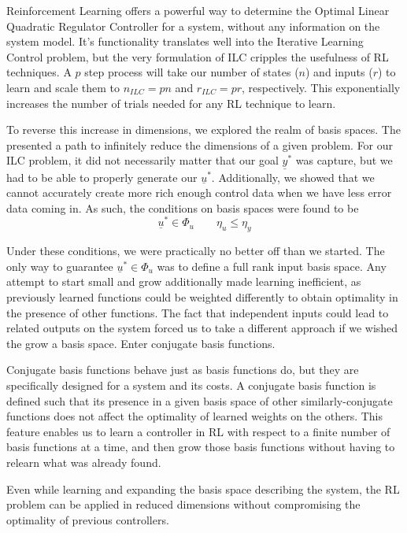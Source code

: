 
\FloatBarrier%
Reinforcement Learning offers a powerful way to determine the Optimal Linear Quadratic Regulator Controller for a system, without any information on the system model. It's functionality translates well into the Iterative Learning Control problem, but the very formulation of ILC cripples the usefulness of RL techniques. A $p$ step process will take our number of states ($n$) and inputs ($r$) to learn and scale them to $n_{ILC} = pn$ and $r_{ILC} = pr$, respectively. This exponentially increases the number of trials needed for any RL technique to learn.

To reverse this increase in dimensions, we explored the realm of basis spaces. The presented a path to infinitely reduce the dimensions of a given problem. For our ILC problem, it did not necessarily matter that our goal $\underline{y}^\ast$ was capture, but we had to be able to properly generate our $\underline{u}^\ast$. Additionally, we showed that we cannot accurately create more rich enough control data when we have less error data coming in. As such, the conditions on basis spaces were found to be
\begin{equation}
    \underline{u}^\ast \in \Phi_u
    \qquad
    \eta_u \leq \eta_y
\end{equation}

Under these conditions, we were practically no better off than we started. The only way to guarantee $\underline{u}^\ast \in \Phi_u$ was to define a full rank input basis space. Any attempt to start small and grow additionally made learning inefficient, as previously learned functions could be weighted differently to obtain optimality in the presence of other functions. The fact that independent inputs could lead to related outputs on the system forced us to take a different approach if we wished the grow a basis space. Enter conjugate basis functions.

Conjugate basis functions behave just as basis functions do, but they are specifically designed for a system and its costs. A conjugate basis function is defined such that its presence in a given basis space of other similarly-conjugate functions does not affect the optimality of learned weights on the others. This feature enables us to learn a controller in RL with respect to a finite number of basis functions at a time, and then grow those basis functions without having to relearn what was already found.

Even while learning and expanding the basis space describing the system, the RL problem can be applied in reduced dimensions without compromising the optimality of previous controllers.

